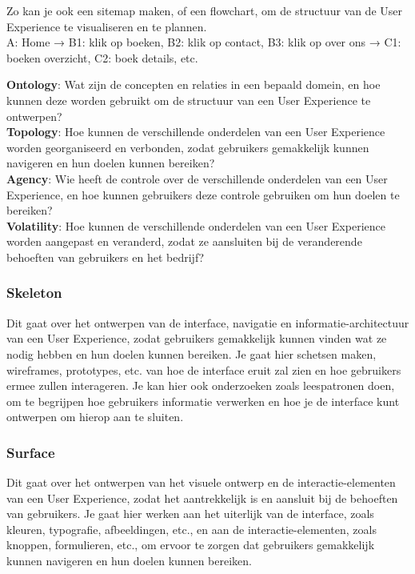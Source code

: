 \documentclass[nonacm, sigconf, balance=true]{acmart}
\begin{document}
    Zo kan je ook een sitemap maken, of een flowchart, om de structuur van de User Experience te visualiseren en te plannen.\\
    A: Home → B1: klik op boeken, B2: klik op contact, B3: klik op over ons → C1: boeken overzicht, C2: boek details, etc.

    \newline
    \noindent\textbf{Ontology}: Wat zijn de concepten en relaties in een bepaald domein, en hoe kunnen deze worden gebruikt om de structuur van een User Experience te ontwerpen?\\
    \textbf{Topology}: Hoe kunnen de verschillende onderdelen van een User Experience worden georganiseerd en verbonden, zodat gebruikers gemakkelijk kunnen navigeren en hun doelen kunnen bereiken?\\
    \textbf{Agency}: Wie heeft de controle over de verschillende onderdelen van een User Experience, en hoe kunnen gebruikers deze controle gebruiken om hun doelen te bereiken?\\
    \textbf{Volatility}: Hoe kunnen de verschillende onderdelen van een User Experience worden aangepast en veranderd, zodat ze aansluiten bij de veranderende behoeften van gebruikers en het bedrijf?\\

    \subsubsection{Skeleton}
    Dit gaat over het ontwerpen van de interface, navigatie en informatie-architectuur van een User Experience, zodat gebruikers gemakkelijk kunnen vinden wat ze nodig hebben en hun doelen kunnen bereiken.
    Je gaat hier schetsen maken, wireframes, prototypes, etc. van hoe de interface eruit zal zien en hoe gebruikers ermee zullen interageren.
    Je kan hier ook onderzoeken zoals leespatronen doen, om te begrijpen hoe gebruikers informatie verwerken en hoe je de interface kunt ontwerpen om hierop aan te sluiten.

    \subsubsection{Surface}
    Dit gaat over het ontwerpen van het visuele ontwerp en de interactie-elementen van een User Experience, zodat het aantrekkelijk is en aansluit bij de behoeften van gebruikers.
    Je gaat hier werken aan het uiterlijk van de interface, zoals kleuren, typografie, afbeeldingen, etc., en aan de interactie-elementen, zoals knoppen, formulieren, etc., om ervoor te zorgen dat gebruikers gemakkelijk kunnen navigeren en hun doelen kunnen bereiken.
\end{document}
